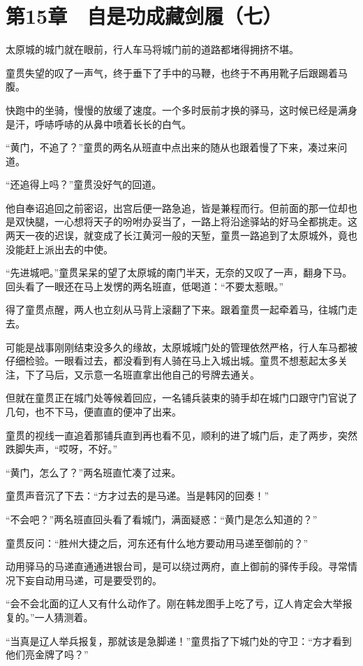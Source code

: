 \section{第15章　自是功成藏剑履（七）}

太原城的城门就在眼前，行人车马将城门前的道路都堵得拥挤不堪。

童贯失望的叹了一声气，终于垂下了手中的马鞭，也终于不再用靴子后跟踢着马腹。

快跑中的坐骑，慢慢的放缓了速度。一个多时辰前才换的驿马，这时候已经是满身是汗，呼哧呼哧的从鼻中喷着长长的白气。

“黄门，不追了？”童贯的两名从班直中点出来的随从也跟着慢了下来，凑过来问道。

“还追得上吗？”童贯没好气的回道。

他自奉诏追回之前密诏，出宫后便一路急追，皆是兼程而行。但前面的那一位却也是双快腿，一心想将天子的吩咐办妥当了，一路上将沿途驿站的好马全都挑走。这两天一夜的迟误，就变成了长江黄河一般的天堑，童贯一路追到了太原城外，竟也没能赶上派出去的中使。

“先进城吧。”童贯呆呆的望了太原城的南门半天，无奈的又叹了一声，翻身下马。回头看了一眼还在马上发愣的两名班直，低喝道：“不要太惹眼。”

得了童贯点醒，两人也立刻从马背上滚翻了下来。跟着童贯一起牵着马，往城门走去。

可能是战事刚刚结束没多久的缘故，太原城城门处的管理依然严格，行人车马都被仔细检验。一眼看过去，都没看到有人骑在马上入城出城。童贯不想惹起太多关注，下了马后，又示意一名班直拿出他自己的号牌去通关。

但就在童贯正在城门处等候着回应，一名铺兵装束的骑手却在城门口跟守门官说了几句，也不下马，便直直的便冲了出来。

童贯的视线一直追着那铺兵直到再也看不见，顺利的进了城门后，走了两步，突然跌脚失声，“哎呀，不好。”

“黄门，怎么了？”两名班直忙凑了过来。

童贯声音沉了下去：“方才过去的是马递。当是韩冈的回奏！”

“不会吧？”两名班直回头看了看城门，满面疑惑：“黄门是怎么知道的？”

童贯反问：“胜州大捷之后，河东还有什么地方要动用马递至御前的？”

动用驿马的马递直通通进银台司，是可以绕过两府，直上御前的驿传手段。寻常情况下妄自动用马递，可是要受罚的。

“会不会北面的辽人又有什么动作了。刚在韩龙图手上吃了亏，辽人肯定会大举报复的。”一人猜测着。

“当真是辽人举兵报复，那就该是急脚递！”童贯指了下城门处的守卫：“方才看到他们亮金牌了吗？”

